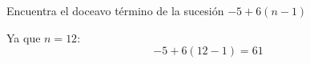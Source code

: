 Encuentra el doceavo término de la sucesión $-5+6(n-1)$

\begin{solutionbox}{1.6cm}
    Ya que $n=12$:
    \[-5+6(12-1)=61\]
\end{solutionbox}